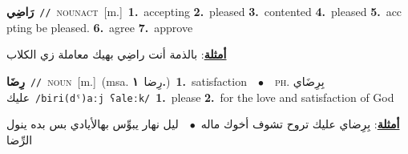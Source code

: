 \documentclass[10pt,a4paper,twoside]{article} %
\begin{document}
\begin{multicols}{2}
{\setlength\topsep{0pt}\textbf{\foreignlanguage{arabic}{رَاضِي}}\ {\color{gray}\texttt{//}\color{black}}\ \textsc{noun\textunderscore act}\ [m.]\ \textbf{1.}~accepting  \textbf{2.}~pleased  \textbf{3.}~contented  \textbf{4.}~pleased  \textbf{5.}~acc pting be pleased.  \textbf{6.}~agree  \textbf{7.}~approve\  \begin{flushright}\color{gray}\foreignlanguage{arabic}{\textbf{\underline{\foreignlanguage{arabic}{أمثلة}}}: بالذمة أنت راضِي بهيك معاملة زي الكلاب}\end{flushright}\color{black}} \vspace{2mm}

{\setlength\topsep{0pt}\textbf{\foreignlanguage{arabic}{رِضَا}}\ {\color{gray}\texttt{//}\color{black}}\ \textsc{noun}\ [m.]\ \color{gray}(msa. \foreignlanguage{arabic}{رِضا}~\foreignlanguage{arabic}{\textbf{١.}})\color{black}\ \textbf{1.}~satisfaction\ \ $\bullet$\ \ \textsc{ph.} \color{gray} \foreignlanguage{arabic}{بِرِضَاي عليك}\color{black}\ {\color{gray}\texttt{/{\sffamily biri(dˤ)aːj ʕaleːk}/}\color{black}}\ \textbf{1.}~please  \textbf{2.}~for the love and satisfaction of God\  \begin{flushright}\color{gray}\foreignlanguage{arabic}{\textbf{\underline{\foreignlanguage{arabic}{أمثلة}}}: بِرِضاي عليك تروح تشوف أخوك ماله\ $\bullet$\ \  ليل نهار يبوِّس بهالأيادي بس بده ينول الرِّضا}\end{flushright}\color{black}} \vspace{2mm}


\end{multicols}
\end{document}
